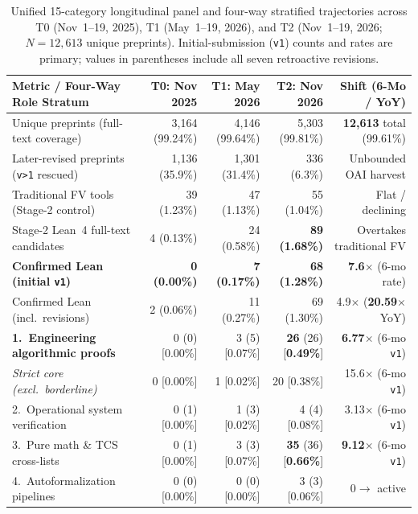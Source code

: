 \documentclass[11pt,letterpaper]{article}
\begin{document}
\begin{itemize}
\end{itemize}

\begin{table}[t]
\centering
\caption{Unified 15-category longitudinal panel and four-way stratified trajectories across T0 (Nov~1--19, 2025), T1 (May~1--19, 2026), and T2 (Nov~1--19, 2026; $N = 12{,}613$ unique preprints). Initial-submission (\texttt{v1}) counts and rates are primary; values in parentheses include all seven retroactive revisions.}
\label{tab:longitudinal_15cat}
\scriptsize
\setlength{\tabcolsep}{1.2pt}
\begin{tabular}{lrrrr}
\toprule
\textbf{Metric / Four-Way Role Stratum} & \textbf{T0: Nov 2025} & \textbf{T1: May 2026} & \textbf{T2: Nov 2026} & \textbf{Shift (6-Mo / YoY)} \\
\midrule
Unique preprints (full-text coverage) & 3,164 (99.24\%) & 4,146 (99.64\%) & 5,303 (99.81\%) & \textbf{12,613} total (99.61\%) \\
Later-revised preprints (\texttt{v>1} rescued) & 1,136 (35.9\%) & 1,301 (31.4\%) & 336 (6.3\%) & Unbounded OAI harvest \\
\midrule
Traditional FV tools (Stage-2 control) & 39 (1.23\%) & 47 (1.13\%) & 55 (1.04\%) & Flat / declining \\
Stage-2 Lean~4 full-text candidates & 4 (0.13\%) & 24 (0.58\%) & \textbf{89 (1.68\%)} & Overtakes traditional FV \\
\textbf{Confirmed Lean (initial \texttt{v1})} & \textbf{0 (0.00\%)} & \textbf{7 (0.17\%)} & \textbf{68 (1.28\%)} & \textbf{7.6$\times$} (6-mo rate) \\
Confirmed Lean (incl.\ revisions) & 2 (0.06\%) & 11 (0.27\%) & 69 (1.30\%) & 4.9$\times$ (\textbf{20.59$\times$} YoY) \\
\midrule
\textbf{1.\ Engineering algorithmic proofs} & 0 (0) [0.00\%] & 3 (5) [0.07\%] & \textbf{26} (26) [\textbf{0.49\%}] & \textbf{6.77$\times$} (6-mo \texttt{v1}) \\
\quad \emph{Strict core (excl.\ borderline)} & 0 [0.00\%] & 1 [0.02\%] & 20 [0.38\%] & 15.6$\times$ (6-mo \texttt{v1}) \\
2.\ Operational system verification & 0 (1) [0.00\%] & 1 (3) [0.02\%] & 4 (4) [0.08\%] & 3.13$\times$ (6-mo \texttt{v1}) \\
3.\ Pure math \& TCS cross-lists & 0 (1) [0.00\%] & 3 (3) [0.07\%] & \textbf{35} (36) [\textbf{0.66\%}] & \textbf{9.12$\times$} (6-mo \texttt{v1}) \\
4.\ Autoformalization pipelines & 0 (0) [0.00\%] & 0 (0) [0.00\%] & 3 (3) [0.06\%] & $0 \to$ active \\

\end{tabular}
\end{table}
\end{document}
